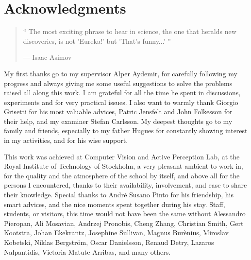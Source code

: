 \chapter{Acknowledgments}

\begin{quote}
`` The most exciting phrase to hear in science, the one that heralds new discoveries, is not 'Eureka!' but 'That's funny...' ''

--- Isaac Asimov
\end{quote}

My first thanks go to my supervisor Alper Aydemir, for carefully following my progress and always giving me some useful suggestions to solve the problems  raised all along this work. I am grateful for all the time he spent in discussions, experiments and for very practical issues. I also want to warmly thank Giorgio Grisetti for his most valuable advices, Patric Jensfelt and John Folkesson for their help, and my examiner Stefan Carlsson. My deepest thoughts go to my family and friends, especially to my father Hugues for constantly showing interest in my activities, and for his wise support.

This work was achieved at Computer Vision and Active Perception Lab, at the Royal Institute of Technology of Stockholm, a very pleasant ambient to work in, for the quality and the atmosphere of the school by itself, and above all for the persons I encountered, thanks to their availability, involvement, and ease to share their knowledge. Special thanks to Andr\'{e} Susano Pinto for his friendship, his smart advices, and the nice moments spent together during his stay. Staff, students, or visitors, this time would not have been the same without Alessandro Pieropan, Ali Mosavian, Andrzej Pronobis, Cheng Zhang, Christian Smith, Gert Kootstra, Johan Ekekrantz, Josephine Sullivan, Magnus Bur\`{e}nius, Miroslav Kobetski, Niklas Bergstr\"{o}m, Oscar Danielsson, Renaud Detry, Lazaros Nalpantidis, Victoria Matute Arribas, and many others.


